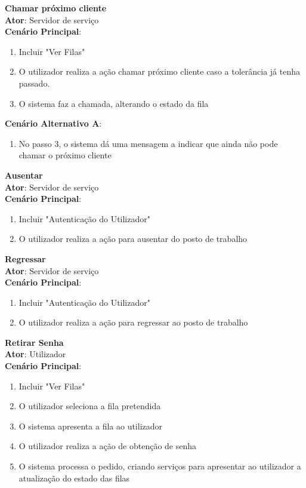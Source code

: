 {\large\textbf{Chamar próximo cliente}} \\
\textbf{Ator}: Servidor de serviço \\
\textbf{Cenário Principal}:

\begin{enumerate}[nolistsep]
	\item Incluir "Ver Filas"
	\item O utilizador realiza a ação chamar próximo cliente caso a tolerância já tenha passado.
	\item O sistema faz a chamada, alterando o estado da fila
\end{enumerate}

\textbf{Cenário Alternativo A}:

\begin{enumerate}[nolistsep]
	\item No passo 3, o sistema dá uma mensagem a indicar que ainda não pode chamar o próximo cliente
\end{enumerate}

{\large\textbf{Ausentar}} \\
\textbf{Ator}: Servidor de serviço \\
\textbf{Cenário Principal}:

\begin{enumerate}[nolistsep]
	\item Incluir "Autenticação do Utilizador"
	\item O utilizador realiza a ação para ausentar do posto de trabalho
\end{enumerate}

{\large\textbf{Regressar}} \\
\textbf{Ator}: Servidor de serviço \\
\textbf{Cenário Principal}:

\begin{enumerate}[nolistsep]
	\item Incluir "Autenticação do Utilizador"
	\item O utilizador realiza a ação para regressar ao posto de trabalho
\end{enumerate}

{\large\textbf{Retirar Senha}} \\
\textbf{Ator}: Utilizador \\
\textbf{Cenário Principal}:

\begin{enumerate}[nolistsep]
	\item Incluir "Ver Filas"
	\item O utilizador seleciona a fila pretendida
	\item O sistema apresenta a fila ao utilizador
	\item O utilizador realiza a ação de obtenção de senha
	\item O sistema processa o pedido, criando serviços para apresentar ao utilizador a atualização do estado das filas
\end{enumerate}

